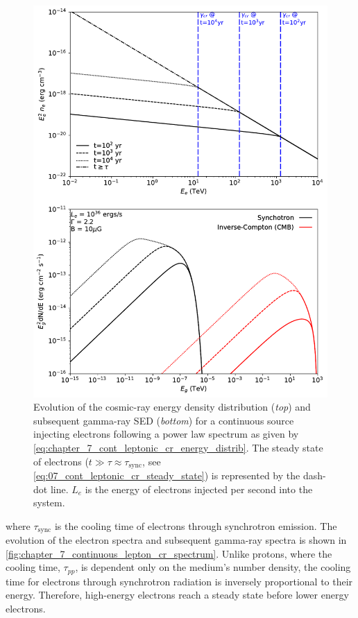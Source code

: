 \begin{figure} [hbtp]
	\centering
	\includegraphics[width=1.0\textwidth]{07_Particle_Evolution/Images/evolution/continuous_electron_total_spectrum.pdf}
	\caption{Evolution of the cosmic-ray energy density distribution (\textit{top}) and subsequent gamma-ray SED (\textit{bottom}) for a continuous source injecting electrons following a power law spectrum as given by \autoref{eq:chapter_7_cont_leptonic_cr_energy_distrib}. The steady state of electrons ($t\gg \tau\approx \tau_\text{sync}$, see \autoref{eq:07_cont_leptonic_cr_steady_state}) is represented by the dash-dot line. $L_e$ is the energy of electrons injected per second into the system.}
	\label{fig:chapter_7_continuous_lepton_cr_spectrum}
\end{figure}

\noindent where $\tau_\text{sync}$ is the cooling time of electrons through synchrotron emission. The evolution of the electron spectra and subsequent gamma-ray spectra is shown in \autoref{fig:chapter_7_continuous_lepton_cr_spectrum}. Unlike protons, where the cooling time, $\tau_{pp}$, is dependent only on the medium's number density, the cooling time for electrons through synchrotron radiation is inversely proportional to their energy. Therefore, high-energy electrons reach a steady state before lower energy electrons.

